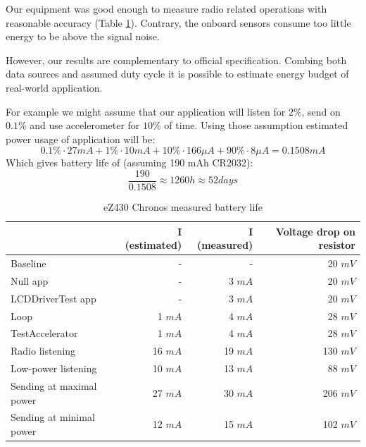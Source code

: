Our equipment was good enough to measure radio related operations with reasonable accuracy (Table \ref{tab:power-usage}).
Contrary, the onboard sensors consume too little energy to be above the signal noise.

However, our results are complementary to official specification.
Combing both data sources and assumed duty cycle it is possible to estimate energy budget of real-world application.

For example we might assume that our application will listen for $2 \%$, send on $ 0.1 \% $ and use accelerometer for $ 10 \% $ of time.
Using those assumption estimated power usage of application will be:
\begin{equation}
0.1 \% \cdot 27 mA + 1 \% \cdot 10 mA + 10 \% \cdot 166 \mu A + 90 \% \cdot 8 \mu A = 0.1508 mA   
  \label{eqn:power_example}
\end{equation}
Which gives battery life of (assuming 190 mAh CR2032):
$$
\frac{190}{0.1508} \approx 1260 h \approx 52 days
$$



\begin{table}[h]
  \centering
    \begin{tabular}{|l|r|r|r|}
        \hline
              & \textbf{I (estimated)} & \textbf{I (measured)}          & \textbf{Voltage drop on resistor}  \\ \hline
Baseline & - & - & 20 $ mV $ \\ \hline
Null app    & - & 3 $ mA $          & 20 $ mV $  \\ \hline
LCDDriverTest app    & - & 3 $ mA $ & 20 $ mV $  \\ \hline
Loop    & 1 $ mA $ & 4 $ mA $          & 28 $ mV $  \\ \hline
TestAccelerator     & 1 $ mA $ & 4 $ mA $          & 28 $ mV $  \\ \hline
Radio listening     & 16 $ mA $ & 19 $ mA $   & 130 $ mV $  \\ \hline
Low-power listening     & 10 $ mA $ & 13 $ mA $              & 88 $ mV $  \\ \hline
Sending at maximal power     & 27 $ mA $ & 30 $ mA $              & 206 $ mV $  \\ \hline
Sending at minimal power      & 12 $ mA $ & 15 $ mA $            & 102 $ mV $  \\ \hline

    \end{tabular}
  \caption{eZ430 Chronos measured battery life}
  \label{tab:power-usage}
\end{table}

